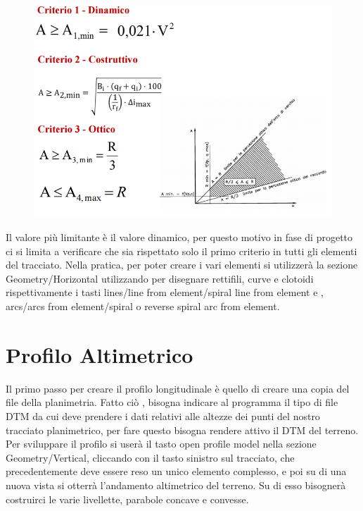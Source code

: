 \begin{figure}[H]
	\centering
	\includegraphics[width=\linewidth]{Figures/criteri di verifica}
    \label{fig:criteri di verifica}
\end{figure}

Il valore più limitante è il valore dinamico, per questo motivo in fase di progetto ci si limita a verificare che sia rispettato solo il primo criterio in tutti gli elementi del tracciato.
\leavevmode
Nella pratica, per poter creare i vari elementi si utilizzerà la sezione Geometry/Horizontal utilizzando per disegnare rettifili, curve e clotoidi rispettivamente i tasti lines/line from element/spiral line from element e      ,                         arcs/arcs from element/spiral o reverse spiral arc from element.

\section{Profilo Altimetrico}

Il primo passo per creare il profilo longitudinale è quello di creare una copia del file della planimetria. Fatto ciò , bisogna indicare al programma il tipo di file DTM da cui deve prendere i dati relativi alle altezze dei punti del nostro tracciato planimetrico, per fare questo bisogna rendere attivo il DTM del terreno. Per sviluppare il profilo si userà il tasto open profile model nella sezione Geometry/Vertical, cliccando con il tasto sinistro sul tracciato, che precedentemente deve essere reso un unico elemento complesso, e poi su di una nuova vista si otterrà l’andamento altimetrico del terreno. Su di esso bisognerà costruirci le varie livellette, parabole concave e convesse.

